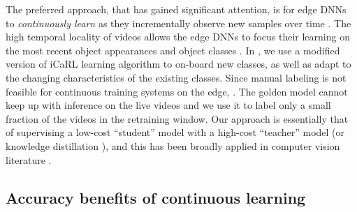  The preferred approach, that has gained significant attention, is for edge DNNs to {\em continuously learn} as they incrementally observe new samples over time \cite{incremental-13, icarl-14, incremental-15}. %
The high temporal locality of videos allows the edge DNNs to focus their learning on the most recent object appearances and object classes \cite{DBLP:conf/cvpr/ShenHPK17, mullapudi2019}.  
In \name, we use a modified version of iCaRL\cite{icarl-14} learning algorithm to on-board new classes, as well as adapt to the changing characteristics of the existing classes. %
Since manual labeling is not feasible for continuous training systems on the edge, . The golden model cannot keep up with inference on the live videos and we use it to label only a small fraction of the videos in the retraining window. %
Our approach is essentially that of supervising a low-cost ``student'' model with a high-cost ``teacher'' model (or knowledge distillation \cite{44873}), and this has been broadly applied in computer vision literature \cite{incremental-13, mullapudi2019, incremental-15, distribution-20}. %


\subsection{Accuracy benefits of continuous learning}
\label{subsec:continuous-measurement}

